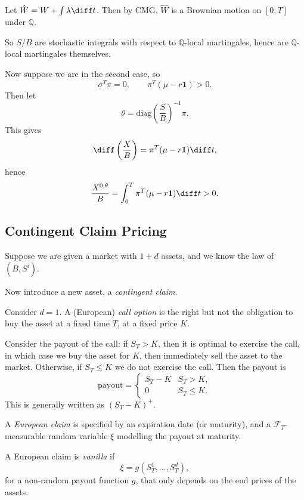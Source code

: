 \documentclass[12pt]{article}
\begin{document}
\begin{proofbox}
	Let $\hat W = W + \int \lambda \diff t$. Then by CMG, $\hat W$ is a Brownian motion on $[0, T]$ under $\mathbb{Q}$.

	So $S/B$ are stochastic integrals with respect to $\mathbb{Q}$-local martingales, hence are $\mathbb{Q}$-local martingales themselves.
\end{proofbox}

Now suppose we are in the second case, so
\[
\sigma^{T} \pi = 0, \qquad \pi^{T}(\mu - r \mathbf{1}) > 0.
\]
Then let
\[
\theta = \mathrm{diag} \left( \frac{S}{B} \right)^{-1} \pi.
\]
This gives
\[
\diff \left( \frac{X}{B} \right) = \pi^{T}(\mu - r \mathbf{1}) \diff t,
\]
hence
\[
\frac{X^{0, \theta}}{B} = \int_0^{T} \pi^{T} (\mu - r \mathbf{1}) \diff t > 0.
\]


\subsection{Contingent Claim Pricing}%
\label{sub:ccp}

Suppose we are given a market with $1 + d$ assets, and we know the law of $(B, S^{i})$.

Now introduce a new asset, a \emph{contingent claim}.

\begin{exbox}
	Consider $d  = 1$. A (European) \emph{call option} is the right but not the obligation to buy the asset at a fixed time $T$, at a fixed price $K$.

	Consider the payout of the call: if $S_T > K$, then it is optimal to exercise the call, in which case we buy the asset for $K$, then immediately sell the asset to the market. Otherwise, if $S_T \leq K$ we do not exercise the call. Then the payout is
	\[
		\text{payout} =
		\begin{cases}
			S_T - K & S_T > K, \\
			0 & S_T \leq K.
		\end{cases}
	\]
	This is generally written as $(S_T - K)^{+}$.
\end{exbox}

\begin{definition}
	A \emph{European claim} is specified by an expiration date (or maturity), and a $\mathcal{F}_T$-measurable random variable $\xi$ modelling the payout at maturity.

	A European claim is \emph{vanilla} if
	\[
	\xi = g(S_T^{1}, \ldots, S_T^{d}),
	\]
	for a non-random payout function $g$, that only depends on the end prices of the assets.
\end{definition}
\end{document}
